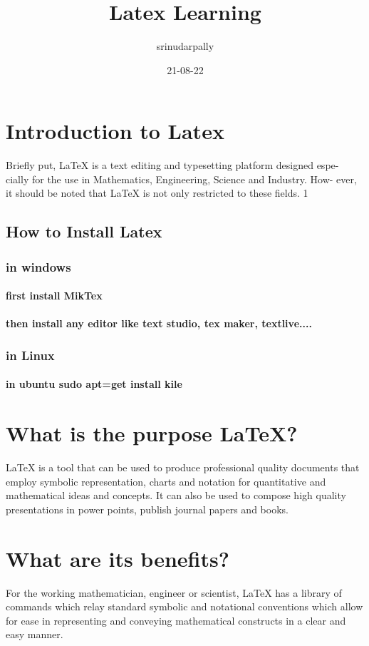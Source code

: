 \documentclass{article}
\title{Latex Learning}
\author{srinudarpally }
\date{21-08-22}
\begin{document}
\maketitle
\tableofcontents

\section{Introduction to Latex}
Briefly put, LaTeX is a text editing and typesetting platform designed espe-
cially for the use in Mathematics, Engineering, Science and Industry. How-
ever, it should be noted that LaTeX is not only restricted to these fields.
1

\subsection{How to Install Latex}
\subsubsection{in windows}
\paragraph{first install MikTex} 
\paragraph{then install any editor like text studio, tex maker, textlive....}

\subsubsection{in Linux}
\paragraph{in ubuntu sudo apt=get install kile}

\section{What is the purpose \LaTeX?}
LaTeX is a tool that can be used to produce professional quality
documents that employ symbolic representation, charts and notation for
quantitative and mathematical ideas and concepts. It can also be used to
compose high quality presentations in power points, publish journal papers
and books.

\section{What are its benefits?}
For the working mathematician, engineer or scientist, LaTeX has a library
of commands which relay standard symbolic and notational conventions
which allow for ease in representing and conveying mathematical
constructs in a clear and easy manner.
\end{document}
